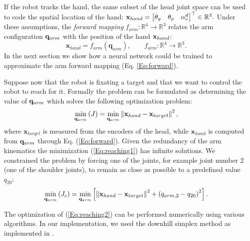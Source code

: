 If the robot tracks the hand, the same subset of the head joint space 
can be used to code the spatial location of the hand: $
\mathbf{x}_{hand}=
\begin{bmatrix} \theta_y & \theta_p & \alpha_v^d\end{bmatrix}^\top \in \mathbb R^3.
$
%
Under these assumptions, the \emph{forward mapping} 
$f_{arm} : \mathbb R^4 \longrightarrow \mathbb R^3$
relates the arm configuration $\mathbf q_{arm}$ with the position of the hand 
$\mathbf{x}_{hand}$:
%
\begin{equation} 
\label{Eq:forward}
\mathbf x_{hand}=f_{arm}(\mathbf q_{arm}), \qquad f_{arm} : \mathbb R^4 \longrightarrow \mathbb R^3.\end{equation}
%
In the next section we show how a neural network could be trained to approximate
the arm forward mapping (Eq. \ref{Eq:forward}).

Suppose now that the robot is fixating a target and that we want to control 
the robot to reach for it. Formally the problem can be formulated 
as determining the value of $\mathbf q_{arm}$ which solves the 
following optimization problem:
%
\begin{equation} 
\label{Eq:reaching1}
  \displaystyle\min_{\qarm} \left(J\right)=\displaystyle\min_{\qarm}
  \left\|\mathbf x_{hand} - \mathbf x_{target}\right\|^2,
\end{equation}
%
where $\mathbf x_{target}$ is measured from the encoders of the head, while 
$\mathbf x_{hand}$ is computed from $\mathbf q_{arm}$ through Eq. (\ref{Eq:forward}).
Given the redundancy of the arm kinematics the minimization 
(\ref{Eq:reaching1}) has infinite solutions. We constrained the problem by 
forcing one of the joints, for example joint number 2 (one of the shoulder joints), to remain as close 
as possible to a predefined value $q_{20}$:
%
\begin{equation} 
\label{Eq:reaching2}
  \displaystyle\min_{\qarm}\left(J_c\right)=\displaystyle\min_{\qarm}
  \left[
  \left\|\mathbf x_{hand} - \mathbf x_{target}\right\|^2 + \left(q_{arm,2}-q_{20}\right)^2
  \right].
\end{equation}

The optimization of (\ref{Eq:reaching2}) can be performed numerically using 
various algorithms. In our implementation, we used 
the downhill simplex method \cite{ne:Computer:65} as implemented in 
\cite{mo:Press:90}.

